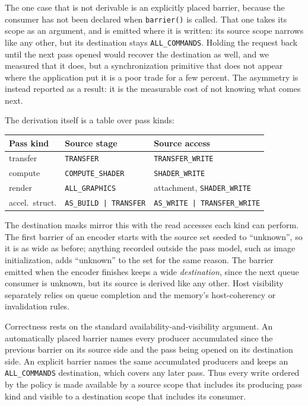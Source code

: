 \documentclass[10pt,twocolumn]{article}
\begin{document}
The one case that is not derivable is an explicitly placed barrier, because
the consumer has not been declared when \texttt{barrier()} is called. That one
takes its scope as an argument, and is emitted where it is written: its source
scope narrows like any other, but its destination stays \texttt{ALL\_COMMANDS}.
Holding the request back until the next pass opened would recover the
destination as well, and we measured that it does, but a synchronization
primitive that does not appear where the application put it is a poor trade for
a few percent. The asymmetry is instead reported as a result: it is the
measurable cost of not knowing what comes next.

The derivation itself is a table over pass kinds:

\begin{center}
\footnotesize
\begin{tabular}{@{}l@{\ \ }l@{\ \ }l@{}}
\toprule
Pass kind & Source stage & Source access \\
\midrule
transfer & \texttt{TRANSFER} & \texttt{TRANSFER\_WRITE} \\
compute & \texttt{COMPUTE\_SHADER} & \texttt{SHADER\_WRITE} \\
render & \texttt{ALL\_GRAPHICS} & attachment, \texttt{SHADER\_WRITE} \\
accel.\ struct. & \texttt{AS\_BUILD\,|\,TRANSFER} &
  \texttt{AS\_WRITE\,|\,TRANSFER\_WRITE} \\
\bottomrule
\end{tabular}
\end{center}

The destination masks mirror this with the read accesses each kind can perform.
The first barrier of an encoder starts with the source set seeded to
``unknown'', so it is as wide as before; anything recorded outside the pass
model, such as image initialization, adds ``unknown'' to the set for the same
reason. The barrier emitted when the encoder finishes keeps a wide
\emph{destination}, since the next queue consumer is unknown, but its source is
derived like any other. Host visibility separately relies on queue completion
and the memory's host-coherency or invalidation rules.

Correctness rests on the standard availability-and-visibility argument. An
automatically placed barrier names every producer accumulated since the
previous barrier on its source side and the pass being opened on its
destination side. An explicit barrier names the same accumulated producers and
keeps an \texttt{ALL\_COMMANDS} destination, which covers any later pass.
Thus every write ordered by the policy is made available by a source scope
that includes its producing pass kind and visible to a destination scope that
includes its consumer.
\end{document}
